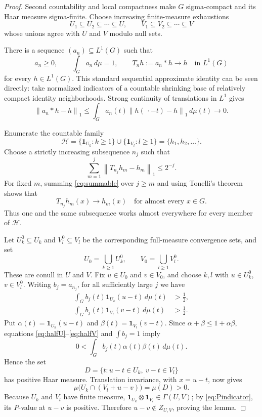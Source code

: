 \documentclass[11pt]{article}
\newcommand{\norm}[1]{\left\lVert #1\right\rVert}
\begin{document}
\begin{proof}
Second countability and local compactness make \(G\) sigma-compact and its
Haar measure sigma-finite.  Choose increasing finite-measure exhaustions
\[
             U_1\subseteq U_2\subseteq\cdots\subseteq U,
             \qquad
             V_1\subseteq V_2\subseteq\cdots\subseteq V
\]
whose unions agree with \(U\) and \(V\) modulo null sets.

There is a sequence \((a_n)\subseteq L^1(G)\) such that
\[
 a_n\geq0,\qquad \int_Ga_n\,d\mu=1,
 \qquad T_nh:=a_n*h\longrightarrow h\quad\text{in }L^1(G)
\]
for every \(h\in L^1(G)\).  This standard sequential approximate identity
can be seen directly: take normalized indicators of a countable shrinking
base of relatively compact identity neighborhoods.  Strong continuity of
translations in \(L^1\) gives
\[
 \norm{a_n*h-h}_1
 \leq\int_G a_n(t)\norm{h(\,\cdot-t)-h}_1\,d\mu(t)
 \longrightarrow0.
\]

Enumerate the countable family
\[
 \mathcal H=\{\mathbf1_{U_k}:k\geq1\}
             \cup\{\mathbf1_{V_l}:l\geq1\}
             =\{h_1,h_2,\ldots\}.
\]
Choose a strictly increasing subsequence \(n_j\) such that
\begin{equation}\label{eq:summable}
        \sum_{m=1}^{j}\norm{T_{n_j}h_m-h_m}_1\leq2^{-j}.
\end{equation}
For fixed \(m\), summing \eqref{eq:summable} over \(j\geq m\) and using
Tonelli's theorem shows that
\[
             T_{n_j}h_m(x)\longrightarrow h_m(x)
             \quad\text{for almost every }x\in G.
\]
Thus one and the same subsequence works almost everywhere for every member
of \(\mathcal H\).

Let \(U_k^0\subseteq U_k\) and \(V_l^0\subseteq V_l\) be the corresponding
full-measure convergence sets, and set
\[
                         U_0=\bigcup_{k\geq1}U_k^0,
                         \qquad
                         V_0=\bigcup_{l\geq1}V_l^0.
\]
These are conull in \(U\) and \(V\).  Fix \(u\in U_0\) and \(v\in V_0\),
and choose \(k,l\) with \(u\in U_k^0\), \(v\in V_l^0\).  Writing
\(b_j=a_{n_j}\), for all sufficiently large \(j\) we have
\begin{align}
 \int_G b_j(t)\mathbf1_{U_k}(u-t)\,d\mu(t)&>\frac12,\label{eq:halfU}\\
 \int_G b_j(t)\mathbf1_{V_l}(v-t)\,d\mu(t)&>\frac12.\label{eq:halfV}
\end{align}
Put \(\alpha(t)=\mathbf1_{U_k}(u-t)\) and
\(\beta(t)=\mathbf1_{V_l}(v-t)\).  Since
\(\alpha+\beta\leq1+\alpha\beta\), equations
\eqref{eq:halfU}--\eqref{eq:halfV} and \(\int b_j=1\) imply
\[
 0<\int_G b_j(t)\alpha(t)\beta(t)\,d\mu(t).
\]
Hence the set
\[
 D=\{t:u-t\in U_k,\ v-t\in V_l\}
\]
has positive Haar measure.  Translation invariance, with \(x=u-t\), now
gives
\[
 \mu\bigl(U_k\cap(V_l+u-v)\bigr)=\mu(D)>0.
\]
Because \(U_k\) and \(V_l\) have finite measure,
\(\mathbf1_{U_k}\otimes\mathbf1_{V_l}\in\Gamma(U,V)\); by
\eqref{eq:Pindicator}, its \(P\)-value at \(u-v\) is positive.  Therefore
\(u-v\notin Z_{U,V}\), proving the lemma.
\end{proof}
\end{document}

